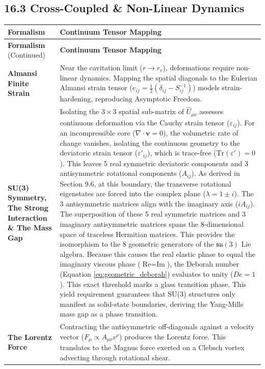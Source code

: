 \subsection*{16.3 Cross-Coupled \& Non-Linear Dynamics}
\renewcommand{\arraystretch}{1.5}
\begin{longtable}{p{} p{}}
    \hline
    \textbf{Formalism} & \textbf{Continuum Tensor Mapping} \\
    \hline
    \endfirsthead
    \hline
    \textbf{Formalism} (Continued) & \textbf{Continuum Tensor Mapping} \\
    \hline
    \endhead
    \hline
    \endfoot
    \textbf{Almansi Finite Strain} & Near the cavitation limit ($r \to r_c$), deformations require non-linear dynamics. Mapping the spatial diagonals to the Eulerian Almansi strain tensor ($e_{ij} = \frac{1}{2}(\delta_{ij} - S_{ij}^{-1})$) models strain-hardening, reproducing Asymptotic Freedom. \\ 
    \textbf{SU(3) Symmetry, The Strong Interaction \& The Mass Gap} & Isolating the $3 \times 3$ spatial sub-matrix of $\hat{U}_{\mu\nu}$ assesses continuous deformation via the Cauchy strain tensor ($\varepsilon_{ij}$). For an incompressible core ($\nabla \cdot \mathbf{v} = 0$), the volumetric rate of change vanishes, isolating the continuous geometry to the deviatoric strain tensor ($\varepsilon'_{ij}$), which is trace-free ($\text{Tr}(\varepsilon') = 0$). This leaves 5 real symmetric deviatoric components and 3 antisymmetric rotational components ($A_{ij}$). As derived in Section 9.6, at this boundary, the transverse rotational eigenstates are forced into the complex plane ($\lambda = 1 \pm i$). The 3 antisymmetric matrices align with the imaginary axis ($i A_{ij}$). The superposition of these 5 real symmetric matrices and 3 imaginary antisymmetric matrices spans the 8-dimensional space of traceless Hermitian matrices. This provides the isomorphism to the 8 geometric generators of the $\mathfrak{su}(3)$ Lie algebra. Because this causes the real elastic phase to equal the imaginary viscous phase ($\text{Re} = \text{Im}$), the Deborah number (Equation \ref{eq:geometric_deborah}) evaluates to unity ($De = 1$). This exact threshold marks a glass transition phase.  This yield requirement guarantees that SU(3) structures only manifest as solid-state boundaries, deriving the Yang-Mills mass gap as a phase transition. \\
    \textbf{The Lorentz Force} & Contracting the antisymmetric off-diagonals against a velocity vector ($F_\mu \propto A_{\mu\nu} v^\nu$) produces the Lorentz force. This translates to the Magnus force exerted on a Clebsch vortex advecting through rotational shear. \\ 

\end{longtable}
